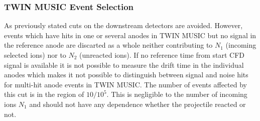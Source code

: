 \subsubsection{TWIN MUSIC Event Selection}
As previously stated cuts on the downstream detectors are avoided. However, events which have hits in one or several anodes in TWIN MUSIC but no signal in the reference anode are discarted as a whole neither contributing to $N_1$ (incoming selected ions) nor to $N_2$ (unreacted ions). If no reference time from start CFD signal is available it is not possible to measure the drift time in the individual anodes which makes it not possible to distinguish between signal and noise hits for multi-hit anode events in TWIN MUSIC. The number of events affected by this cut is in the region of $10/10^5$. This is negligible to the number of incoming ions $N_1$ and should not have any dependence whether the projectile reacted or not.
